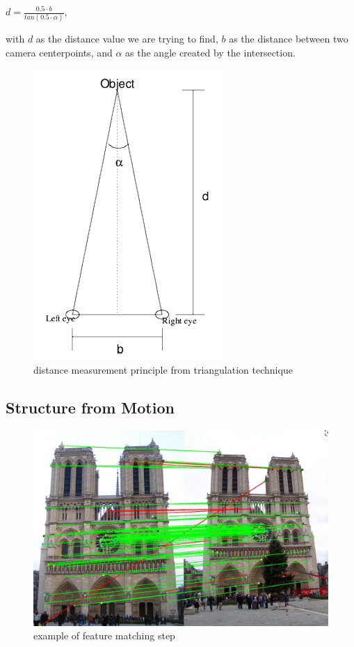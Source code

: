 \begin{center}
    \(d = \frac{0.5 \cdot b}{tan(0.5 \cdot \alpha)}\),
\end{center}
with \(d\) as the distance value we are trying to find, \(b\) as the distance between two camera centerpoints, and \(\alpha\) as the angle created by the intersection.

\begin{figure}[h]
    \centering
    \includegraphics[height=0.5\linewidth]{figures/triangulation_example_02.png}
    \caption{distance measurement principle from triangulation technique}
    \label{fig:triangulation-2}
\end{figure}

\subsection{Structure from Motion}

\begin{figure}[h]
    \centering
    \includegraphics[height=0.5\linewidth]{figures/feature-matching.png}
    \caption{example of feature matching step}
    \label{fig:feature-matching}
\end{figure}

